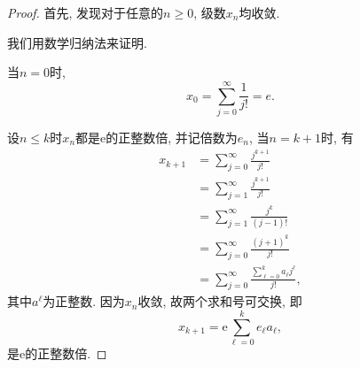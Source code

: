 \documentclass[a4paper,12pt]{ctexart}
\newcommand{\e}{\mathrm{e}}
\begin{document}
    \begin{proof}
        首先, 发现对于任意的$n\geq 0$, 级数$x_n$均收敛.

        我们用数学归纳法来证明.

        当$n=0$时, 
        \begin{equation}
            x_0=\sum_{j=0}^{\infty}{\frac{1}{j!}}=e.
        \end{equation}

        设$n\leq k$时$x_n$都是$\e$的正整数倍, 并记倍数为$e_n$, 当$n=k+1$时, 有
        \begin{equation}
            \begin{aligned}
                x_{k+1}
                &= \sum_{j=0}^{\infty}{\frac{j^{k+1}}{j!}}\\
                &= \sum_{j=1}^{\infty}{\frac{j^{k+1}}{j!}}\\
                &= \sum_{j=1}^{\infty}{\frac{j^{k}}{(j-1)!}}\\
                &= \sum_{j=0}^{\infty}{\frac{(j+1)^{k}}{j!}}\\
                &= \sum_{j=0}^{\infty}
                    {\frac{\sum_{\ell=0}^{k}{a_{\ell}j^{\ell}}}{j!}},
            \end{aligned}
        \end{equation}
        其中$a^{\ell}$为正整数. 因为$x_{n}$收敛, 故两个求和号可交换, 即
        \begin{equation}
            x_{k+1}=\e\sum_{\ell=0}^{k}{e_{\ell}a_{\ell}},
        \end{equation}
        是$\e$的正整数倍.
    \end{proof}

\end{document}
